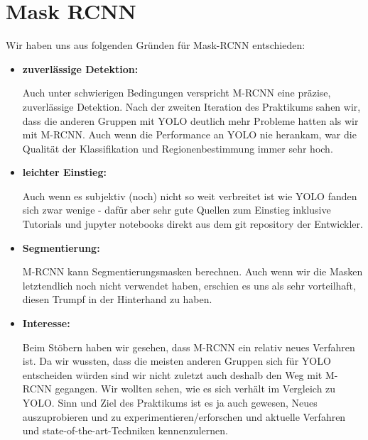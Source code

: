 \section{Mask RCNN}
Wir haben uns aus folgenden Gründen für Mask-RCNN entschieden:
\begin{itemize}
	\item \textbf{zuverlässige Detektion:}
		
		Auch unter schwierigen Bedingungen verspricht M-RCNN eine präzise, zuverlässige Detektion.
		Nach der zweiten Iteration des Praktikums sahen wir, dass die anderen Gruppen mit YOLO deutlich mehr Probleme hatten als wir mit M-RCNN. Auch wenn die Performance an YOLO nie herankam, war die Qualität der Klassifikation und Regionenbestimmung immer sehr hoch.
	\item \textbf{leichter Einstieg:}
		
		Auch wenn es subjektiv (noch) nicht so weit verbreitet ist wie YOLO fanden sich zwar wenige - dafür aber sehr gute Quellen zum Einstieg inklusive Tutorials und jupyter notebooks direkt aus dem git repository der Entwickler.
	\item \textbf{Segmentierung:}
		
		M-RCNN kann Segmentierungsmasken berechnen.
		Auch wenn wir die Masken letztendlich noch nicht verwendet haben, erschien es uns als sehr vorteilhaft, diesen Trumpf in der Hinterhand zu haben.
	\item \textbf{Interesse:}

		Beim Stöbern haben wir gesehen, dass M-RCNN ein relativ neues Verfahren ist.
		Da wir wussten, dass die meisten anderen Gruppen sich für YOLO entscheiden würden sind wir nicht zuletzt auch deshalb den Weg mit M-RCNN gegangen.
		Wir wollten sehen, wie es sich verhält im Vergleich zu YOLO. Sinn und Ziel des Praktikums ist es ja auch gewesen, Neues auszuprobieren und zu experimentieren/erforschen und aktuelle Verfahren und state-of-the-art-Techniken kennenzulernen.

\end{itemize}
